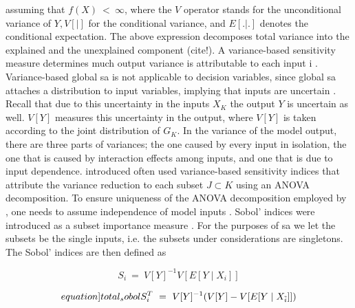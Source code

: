assuming that $f(X)\ <\ ∞$, where the $V$ operator stands for the unconditional variance of $Y, V[|]$ for the conditional variance, and $E[.|.]$ denotes the conditional expectation. The above expression decomposes total variance into the explained and the unexplained component (cite!).
A variance-based sensitivity measure determines much output variance is attributable to each input i \cite{BP16}. Variance-based global sa is not applicable to decision variables, since global sa attaches a distribution to input variables, implying that inputs are uncertain \cite{SNS16}. Recall that due to this uncertainty in the inputs $X_K$ the output $Y$ is uncertain as well. $V[Y]$ measures this uncertainty in the output, where $V[Y]$ is taken according to the joint distribution of $G_K$. In the variance of the model output, there are three parts of variances; the one caused by every input in isolation, the one that is caused by interaction effects among inputs, and one that is due to input dependence.
\cite{S53} introduced often used variance-based sensitivity indices that attribute the variance reduction to each subset $J \subset K$ using an ANOVA decomposition. To ensure uniqueness of the ANOVA decomposition employed by \cite{S53}, one needs to assume independence of model inputs \cite{GM17}. Sobol’ indices were introduced as a subset importance measure \cite{SNS16}. For the purposes of sa we let the subsets be the single inputs, i.e. the subsets under considerations are singletons. The Sobol’ indices are then defined as

\begin{equation}
S_i\ =\ V[Y]^{-1} V[E[Y \mid X_i]]
\end{equation}

\begin{equation} \label[equation]{total_sobol}
S_i^T\ =\ V[Y]^{-1}(V[Y] - V[E[Y \mid {X_{\tilde i}}]])
\end{equation}

